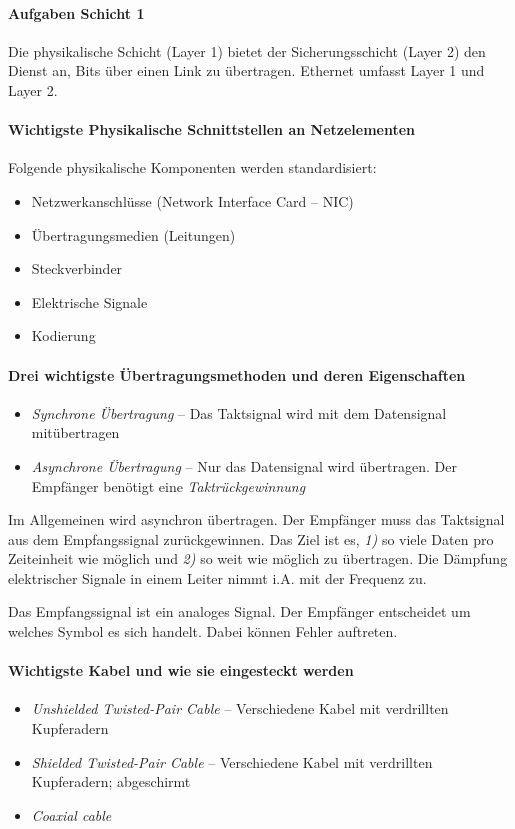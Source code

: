 \documentclass[a4paper,12pt]{article}
\begin{document}
\paragraph{Aufgaben Schicht 1}
Die physikalische Schicht (Layer 1) bietet der Sicherungsschicht (Layer 2) den Dienst an, Bits über einen Link zu übertragen. Ethernet umfasst Layer 1 und Layer 2.

\paragraph{Wichtigste Physikalische Schnittstellen an Netzelementen}

Folgende physikalische Komponenten werden standardisiert:
\begin{itemize}
\item Netzwerkanschlüsse (Network Interface Card -- NIC)
\item Übertragungsmedien (Leitungen)
\item Steckverbinder
\item Elektrische Signale
\item Kodierung
\end{itemize}


\paragraph{Drei wichtigste Übertragungsmethoden und deren Eigenschaften}

\begin{itemize}
\item \emph{Synchrone Übertragung} -- Das Taktsignal wird mit dem Datensignal mitübertragen
\item \emph{Asynchrone Übertragung} -- Nur das Datensignal wird übertragen. Der Empfänger benötigt eine \emph{Taktrückgewinnung}
\end{itemize}

Im Allgemeinen wird asynchron übertragen. Der Empfänger muss das Taktsignal aus dem Empfangssignal zurückgewinnen. Das Ziel ist es, \emph{1)} so viele Daten pro Zeiteinheit wie möglich und \emph{2)} so weit wie möglich zu übertragen. Die Dämpfung elektrischer Signale in einem Leiter nimmt i.A. mit der Frequenz zu.

Das Empfangssignal ist ein analoges Signal. Der Empfänger entscheidet um welches Symbol es sich handelt. Dabei können Fehler auftreten.

\paragraph{Wichtigste Kabel und wie sie eingesteckt werden}
\begin{itemize}
\item \emph{Unshielded Twisted-Pair Cable} -- Verschiedene Kabel mit verdrillten Kupferadern
\item \emph{Shielded Twisted-Pair Cable} -- Verschiedene Kabel mit verdrillten Kupferadern; abgeschirmt
\item \emph{Coaxial cable}
\end{itemize}
\end{document}

